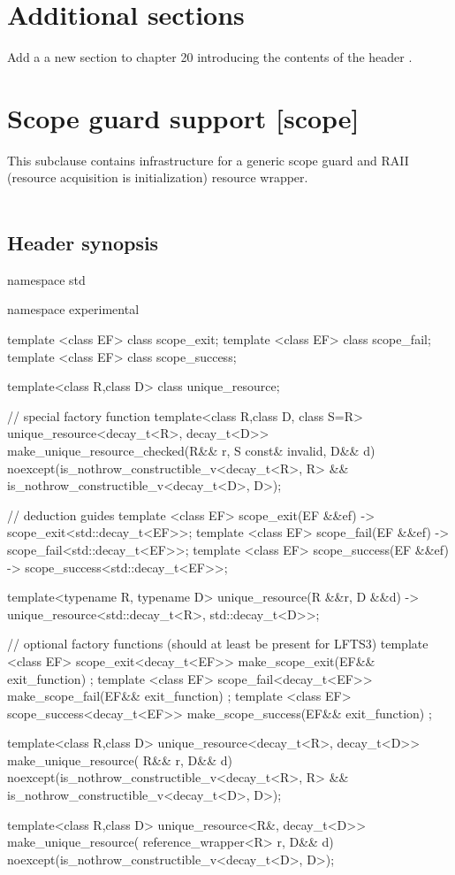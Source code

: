 \documentclass[ebook,11pt,article]{memoir}
\begin{document}
\section{Additional sections}
Add a a new section to chapter 20 introducing the contents of the header .

\section{Scope guard support [scope]}
This subclause contains infrastructure for a generic scope guard and RAII (resource acquisition is initialization) resource wrapper.\\
\\
\subsection{Header  synopsis}


\begin{codeblock}
namespace std {
namespace experimental {
template <class EF>
class scope_exit;
template <class EF>
class scope_fail;
template <class EF>
class scope_success;


template<class R,class D>
class unique_resource;

// special factory function
template<class R,class D, class S=R>
unique_resource<decay_t<R>, decay_t<D>>
make_unique_resource_checked(R&& r, S const& invalid, D&& d)
noexcept(is_nothrow_constructible_v<decay_t<R>, R> &&
         is_nothrow_constructible_v<decay_t<D>, D>);

// deduction guides
template <class EF>
scope_exit(EF &&ef) -> scope_exit<std::decay_t<EF>>;
template <class EF>
scope_fail(EF &&ef) -> scope_fail<std::decay_t<EF>>;
template <class EF>
scope_success(EF &&ef) -> scope_success<std::decay_t<EF>>;

template<typename R, typename D>
unique_resource(R &&r, D &&d) -> unique_resource<std::decay_t<R>, std::decay_t<D>>;




// optional factory functions (should at least be present for LFTS3)
template <class EF>
scope_exit<decay_t<EF>> make_scope_exit(EF&& exit_function) ;
template <class EF>
scope_fail<decay_t<EF>> make_scope_fail(EF&& exit_function) ;
template <class EF>
scope_success<decay_t<EF>> make_scope_success(EF&& exit_function) ;

template<class R,class D>
unique_resource<decay_t<R>, decay_t<D>>
make_unique_resource( R&&  r, D&& d) 
noexcept(is_nothrow_constructible_v<decay_t<R>, R> &&
         is_nothrow_constructible_v<decay_t<D>, D>);

template<class R,class D>
unique_resource<R&, decay_t<D>>
make_unique_resource( reference_wrapper<R>  r, D&& d) 
noexcept(is_nothrow_constructible_v<decay_t<D>, D>);

}}
\end{codeblock}
\end{document}
